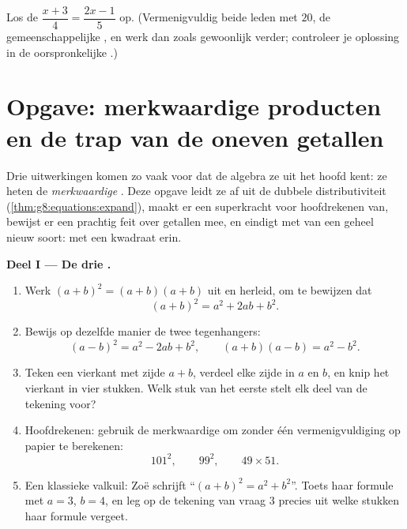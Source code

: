 \begin{exercise}[$\star\star\star$]\label{exo:g8:equations:12}
Los de  $\dfrac{x + 3}{4} = \dfrac{2x - 1}{5}$ op. (Vermenigvuldig
beide leden met $20$, de gemeenschappelijke , en werk dan zoals gewoonlijk
verder; controleer je oplossing in de oorspronkelijke .)
\end{exercise}

\section{Opgave: merkwaardige producten en de trap van de oneven getallen}

\begin{problem}[{Weekendopgave --- $(a+b)^2$, $(a-b)^2$,
$(a+b)(a-b)$, en de som $1 + 3 + 5 + \dots + (2n-1) = n^2$}]
\label{pb:g8:equations:1}
Drie uitwerkingen komen zo vaak voor dat de algebra ze uit het hoofd kent: ze
heten de \emph{merkwaardige }. Deze opgave leidt ze af uit de dubbele
distributiviteit (\cref{thm:g8:equations:expand}), maakt er een superkracht voor
hoofdrekenen van, bewijst er een prachtig feit over  getallen mee, en
eindigt met  van een geheel nieuw soort:  met een
kwadraat erin.

\medskip
\noindent\textbf{Deel I --- De drie .}
\begin{enumerate}
  \item Werk $(a + b)^2 = (a + b)(a + b)$ uit en herleid, om te bewijzen dat
        \[
        (a + b)^2 = a^2 + 2ab + b^2 .
        \]
  \item Bewijs op dezelfde manier de twee tegenhangers:
        \[
        (a - b)^2 = a^2 - 2ab + b^2,
        \qquad
        (a + b)(a - b) = a^2 - b^2 .
        \]
  \item Teken een vierkant met zijde $a + b$, verdeel elke zijde in $a$ en $b$,
        en knip het vierkant in vier stukken. Welk stuk van het eerste 
        stelt elk deel van de tekening voor?
  \item Hoofdrekenen: gebruik de merkwaardige  om zonder één
        vermenigvuldiging op papier te berekenen:
        \[
        101^2, \qquad 99^2, \qquad 49 \times 51 .
        \]
  \item Een klassieke valkuil: Zoë schrijft ``$(a + b)^2 = a^2 + b^2$''. Toets
        haar formule met $a = 3$, $b = 4$, en leg op de tekening van vraag 3
        precies uit welke stukken haar formule vergeet.
\end{enumerate}


\end{problem}
